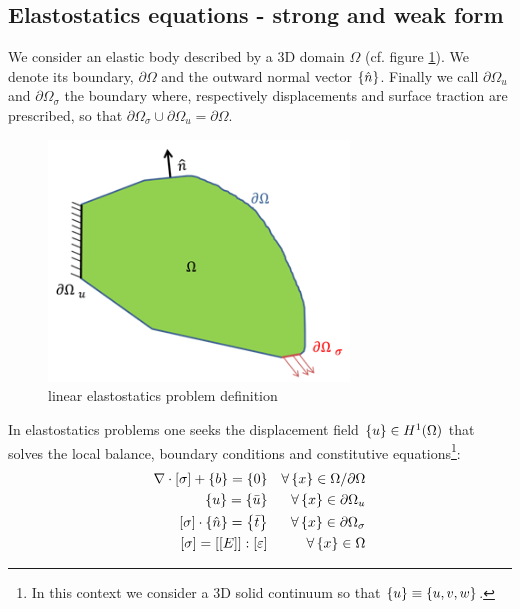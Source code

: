 \subsection{Elastostatics equations - strong and weak form}\label{subsec:1.1.1}
We consider an elastic body described by a 3D domain $\Omega$ (cf. figure \ref{fig.1}). We denote its boundary, $\partial \Omega$ and the outward normal vector $\left\lbrace{\hat{n}}\right \rbrace$.
Finally we call $\partial \Omega_{u}$ and $\partial \Omega_{\sigma}$ the boundary where, respectively displacements and surface traction are prescribed, so that $\partial \Omega_{\sigma} \cup \partial \Omega_{u} =\partial \Omega $. \\
\begin{figure}[ht]
\centering
\includegraphics[width=8cm]{images/Ch1/solid}
\caption{linear elastostatics problem definition}
\label{fig.1}
\end{figure}
In elastostatics problems one seeks the displacement field $\left\lbrace{u}\right \rbrace \in H^1(\Omega)$ that solves the local balance, boundary conditions and constitutive equations\footnote{In this context we consider a 3D solid continuum so that $\left\lbrace{u}\right \rbrace\equiv \left\lbrace{u,v,w}\right \rbrace$.}:
\begin{eqnarray}
\label{eq.1.1}
\nabla \cdot \left[{\sigma}\right] + \left\lbrace{b}\right \rbrace=\left\lbrace{0}\right \rbrace  & & \forall \left\lbrace{x}\right \rbrace \in \Omega/\partial \Omega \\
\label{eq.1.2}
\left\lbrace{u}\right \rbrace=\left\lbrace{\bar{u}}\right \rbrace & & \forall \left\lbrace{x}\right \rbrace \in \partial \Omega_{u}  \\
\label{eq.1.3}
\left[{\sigma}\right]\cdot\left\lbrace{\hat{n}}\right \rbrace=\left\lbrace{\bar{t}}\right \rbrace & & \forall \left\lbrace{x}\right \rbrace \in \partial \Omega_{\sigma}
\\
\label{eq.1.4}
\left[{\sigma}\right]=\left[{\left[{E}\right]}\right]:\left[{ 	\varepsilon}\right] & & \forall \left\lbrace{x}\right \rbrace \in \Omega
\end{eqnarray}
